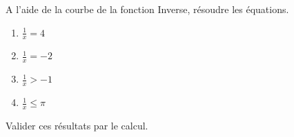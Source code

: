 
A l'aide de la courbe de la fonction Inverse, résoudre les équations.
\begin{enumerate}
\item $\frac{1}{x}=4$
\item $\frac{1}{x}=-2$
\item $\frac{1}{x}>-1$
\item $\frac{1}{x} \leq \pi$
\end{enumerate}
Valider ces résultats par le calcul.